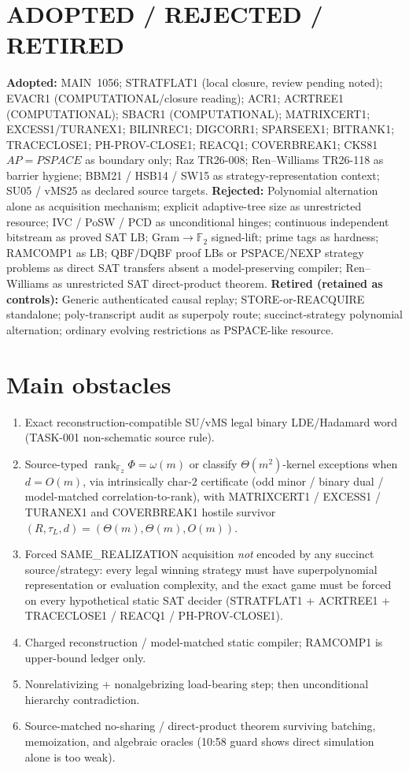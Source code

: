 \documentclass[11pt]{article}
\begin{document}
\section*{ADOPTED / REJECTED / RETIRED}
\textbf{Adopted:} MAIN~1056; STRATFLAT1 (local closure, review pending noted); EVACR1
(COMPUTATIONAL/closure reading); ACR1; ACRTREE1 (COMPUTATIONAL); SBACR1 (COMPUTATIONAL);
MATRIXCERT1; EXCESS1/TURANEX1; BILINREC1; DIGCORR1; SPARSEEX1; BITRANK1; TRACECLOSE1;
PH-PROV-CLOSE1; REACQ1; COVERBREAK1; CKS81 $AP=PSPACE$ as boundary only; Raz TR26-008;
Ren--Williams TR26-118 as barrier hygiene; BBM21 / HSB14 / SW15 as strategy-representation
context; SU05 / vMS25 as declared source targets.
\textbf{Rejected:} Polynomial alternation alone as acquisition mechanism; explicit adaptive-tree
size as unrestricted resource; IVC / PoSW / PCD as unconditional hinges; continuous independent
bitstream as proved SAT LB; Gram$\to\mathbb F_2$ signed-lift; prime tags as hardness;
RAMCOMP1 as LB; QBF/DQBF proof LBs or PSPACE/NEXP strategy problems as direct SAT transfers
absent a model-preserving compiler; Ren--Williams as unrestricted SAT direct-product theorem.
\textbf{Retired (retained as controls):} Generic authenticated causal replay; STORE-or-REACQUIRE
standalone; poly-transcript audit as superpoly route; succinct-strategy polynomial alternation;
ordinary evolving restrictions as PSPACE-like resource.

\section*{Main obstacles}
\begin{enumerate}
\item Exact reconstruction-compatible SU/vMS legal binary LDE/Hadamard word (TASK-001
non-schematic source rule).
\item Source-typed $\operatorname{rank}_{\mathbb F_2}\Phi=\omega(m)$ or classify
$\Theta(m^2)$-kernel exceptions when $d=O(m)$, via intrinsically char-$2$ certificate
(odd minor / binary dual / model-matched correlation-to-rank), with MATRIXCERT1 / EXCESS1 /
TURANEX1 and COVERBREAK1 hostile survivor $(R,\tau_L,d)=(\Theta(m),\Theta(m),O(m))$.
\item Forced SAME\_REALIZATION acquisition \emph{not} encoded by any succinct source/strategy:
every legal winning strategy must have superpolynomial representation or evaluation complexity,
and the exact game must be forced on every hypothetical static SAT decider (STRATFLAT1 +
ACRTREE1 + TRACECLOSE1 / REACQ1 / PH-PROV-CLOSE1).
\item Charged reconstruction / model-matched static compiler; RAMCOMP1 is upper-bound ledger only.
\item Nonrelativizing + nonalgebrizing load-bearing step; then unconditional hierarchy contradiction.
\item Source-matched no-sharing / direct-product theorem surviving batching, memoization, and
algebraic oracles (10:58 guard shows direct simulation alone is too weak).
\end{enumerate}
\end{document}
